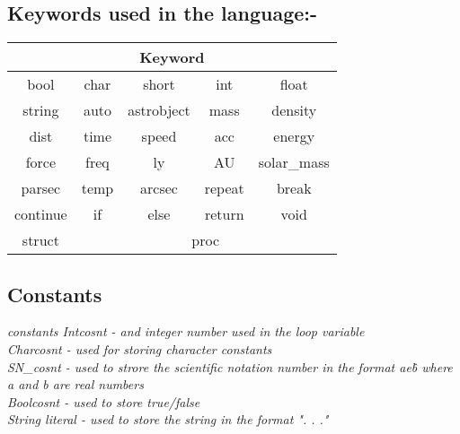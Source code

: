 \documentclass[11pt]{article}
\begin{document}
\subsection{Keywords used in the language:-}
\begin{table}[H]
\centering
\begin{tabular}{|c|c|c|c|c|}
\hline
\multicolumn{5}{|c|}{\textbf{Keyword} }\\
\hline
bool &
char&
short&
int&
float\\
\hline
string& 
auto &
astrobject&
mass&
density\\
\hline
dist&
time&
speed&
acc&
energy\\
\hline
force&
freq&
ly&
AU&
solar\_mass\\
\hline
parsec&
temp&
arcsec&
repeat&
break\\
\hline
continue&
if&
else&
return&
void \\
\hline
struct &
\multicolumn{4}{|c|}{proc}\\
\hline
\end{tabular}
\end{table}

\subsection{Constants}
{\itshape
constants
\hspace*{1cm} Intcosnt - and integer number used in the loop variable\\
\hspace*{1cm} Charcosnt - used for storing character constants\\
\hspace*{1cm} SN\_cosnt - used to strore the scientific notation number in the format ae\^b where a and b are real numbers\\
\hspace*{1cm} Boolcosnt - used to store true/false\\
\hspace*{1cm} String literal - used to store the string in the format ". . ."\\

}
\end{document}
